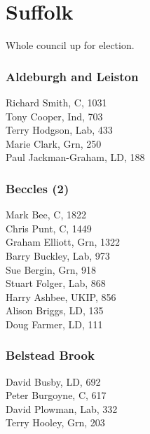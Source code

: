\documentclass[a4paper,openany,10pt]{book}
\begin{document}
\vfill\eject

\section{Suffolk}

Whole council up for election.



\subsubsection*{Aldeburgh and Leiston}



Richard Smith, C, 1031\\
Tony Cooper, Ind, 703\\
Terry Hodgson, Lab, 433\\
Marie Clark, Grn, 250\\
Paul Jackman-Graham, LD, 188\\


\subsubsection*{Beccles (2)}



Mark Bee, C, 1822\\
Chris Punt, C, 1449\\
Graham Elliott, Grn, 1322\\
Barry Buckley, Lab, 973\\
Sue Bergin, Grn, 918\\
Stuart Folger, Lab, 868\\
Harry Ashbee, UKIP, 856\\
Alison Briggs, LD, 135\\
Doug Farmer, LD, 111\\


\subsubsection*{Belstead Brook}



David Busby, LD, 692\\
Peter Burgoyne, C, 617\\
David Plowman, Lab, 332\\
Terry Hooley, Grn, 203\\
\end{document}
